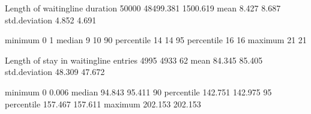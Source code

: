 \documentclass[letterpaper,10pt,english]{sphinxmanual}
\begin{document}
\begin{sphinxVerbatim}[commandchars=\\\{\}]
\PYGZhy{}\PYGZhy{}\PYGZhy{}\PYGZhy{}\PYGZhy{}\PYGZhy{}\PYGZhy{}\PYGZhy{}\PYGZhy{}\PYGZhy{}\PYGZhy{}\PYGZhy{}\PYGZhy{}\PYGZhy{}\PYGZhy{}\PYGZhy{}\PYGZhy{}\PYGZhy{}\PYGZhy{}\PYGZhy{}\PYGZhy{}\PYGZhy{}\PYGZhy{}\PYGZhy{}\PYGZhy{}\PYGZhy{}\PYGZhy{}\PYGZhy{}\PYGZhy{}\PYGZhy{}\PYGZhy{}\PYGZhy{}\PYGZhy{}\PYGZhy{}\PYGZhy{}\PYGZhy{}\PYGZhy{}\PYGZhy{}\PYGZhy{}\PYGZhy{}\PYGZhy{}\PYGZhy{}\PYGZhy{}\PYGZhy{} \PYGZhy{}\PYGZhy{}\PYGZhy{}\PYGZhy{}\PYGZhy{}\PYGZhy{}\PYGZhy{}\PYGZhy{}\PYGZhy{}\PYGZhy{}\PYGZhy{}\PYGZhy{}\PYGZhy{}\PYGZhy{} \PYGZhy{}\PYGZhy{}\PYGZhy{}\PYGZhy{}\PYGZhy{}\PYGZhy{}\PYGZhy{}\PYGZhy{}\PYGZhy{}\PYGZhy{}\PYGZhy{}\PYGZhy{} \PYGZhy{}\PYGZhy{}\PYGZhy{}\PYGZhy{}\PYGZhy{}\PYGZhy{}\PYGZhy{}\PYGZhy{}\PYGZhy{}\PYGZhy{}\PYGZhy{}\PYGZhy{} \PYGZhy{}\PYGZhy{}\PYGZhy{}\PYGZhy{}\PYGZhy{}\PYGZhy{}\PYGZhy{}\PYGZhy{}\PYGZhy{}\PYGZhy{}\PYGZhy{}\PYGZhy{}
Length of waitingline                        duration          50000        48499.381     1500.619
                                             mean                  8.427        8.687
                                             std.deviation         4.852        4.691

                                             minimum               0            1
                                             median                9           10
                                             90\PYGZpc{} percentile       14           14
                                             95\PYGZpc{} percentile       16           16
                                             maximum              21           21

Length of stay in waitingline                entries            4995         4933           62
                                             mean                 84.345       85.405
                                             std.deviation        48.309       47.672

                                             minimum               0            0.006
                                             median               94.843       95.411
                                             90\PYGZpc{} percentile      142.751      142.975
                                             95\PYGZpc{} percentile      157.467      157.611
                                             maximum             202.153      202.153
\end{sphinxVerbatim}
\end{document}

